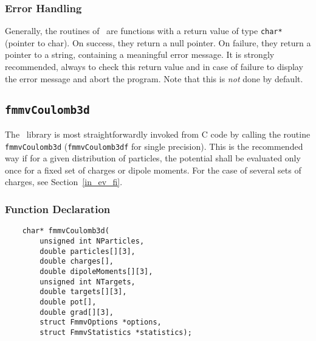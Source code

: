 \subsubsection*{Error Handling}
Generally, the routines of \fmmv\ are functions with a return value
of type \verb|char*| (pointer to char).
On success, they return a null pointer.
On failure, they return a pointer to a string, containing a
meaningful error message.
It is strongly recommended, always to check this return value and 
in case of failure to display the error message and abort the program.
Note that this is {\em not} done by default.


\subsection{{\tt fmmvCoulomb3d}}\label{allinone}
The \fmmv\ library is most straightforwardly invoked from C code by calling 
the routine \verb|fmmvCoulomb3d| (\verb|fmmvCoulomb3df| for single
precision). This is the recommended way if for a given distribution of particles,
the potential shall be evaluated only once
for a fixed set of charges or dipole moments.
For the case of several sets of charges, see Section~\ref{in_ev_fi}.
\subsubsection*{Function Declaration} %
\begin{verbatim}
    char* fmmvCoulomb3d(
        unsigned int NParticles, 
        double particles[][3], 
        double charges[],
        double dipoleMoments[][3],
        unsigned int NTargets, 
        double targets[][3],
        double pot[],      	
        double grad[][3], 	
        struct FmmvOptions *options, 
        struct FmmvStatistics *statistics);
\end{verbatim}

